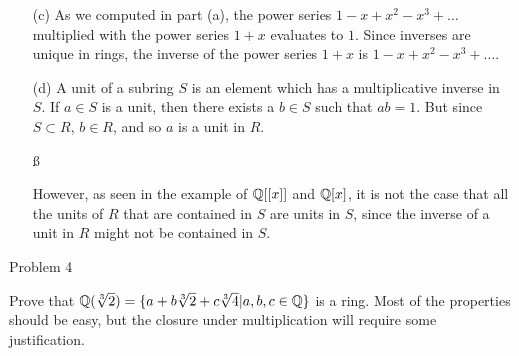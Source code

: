 \documentclass{hmwk}
\begin{document}
\begin{solution}
\begin{itemize}
    \item[(c)] As we computed in part (a), the power series $1 - x + x^2 - x^3 + \dots$ multiplied with the power series $1 + x$ evaluates to $1$. Since inverses are unique in rings, the inverse of the power series $1 + x$ is $1 - x + x^2 - x^3 + \dots$.

    \item[(d)] A unit of a subring $S$ is an element which has a multiplicative inverse in $S$. If $a \in S$ is a unit, then there exists a $b \in S$ such that $ab = 1$. But since $S \subset R$, $b \in R$, and so $a$ is a unit in $R$. 

    \ss

    However, as seen in the example of $\mathbb{Q}[[x]]$ and $\mathbb{Q}[x]$, it is not the case that all the units of $R$ that are contained in $S$ are units in $S$, since the inverse of a unit in $R$ might not be contained in $S$.
\end{itemize}
\end{solution}

\begin{problem}{Problem 4}

\pre Prove that $\mathbb{Q}(\sqrt[3]{2}) = \{ a + b\sqrt[3]{2}+c \sqrt[3]{4}  | a,b, c \in \mathbb{Q}\}$ is a ring. Most of the properties should be easy, but the closure under multiplication will require some justification.
    
\end{problem}
\end{document}
